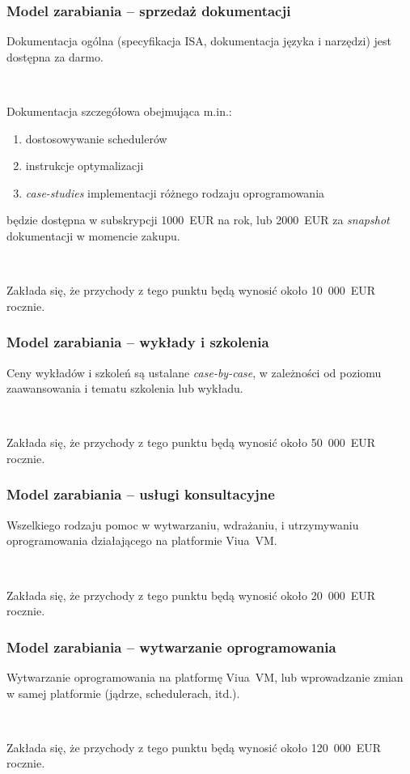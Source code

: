 \documentclass[aspectratio=169]{beamer}
\begin{document}
\begin{frame}
    \frametitle{Model zarabiania -- sprzedaż dokumentacji}

    Dokumentacja ogólna (specyfikacja ISA, dokumentacja języka i narzędzi) jest
    dostępna za darmo.

    ~

    Dokumentacja szczegółowa obejmująca m.in.:

    \begin{enumerate}
        \item dostosowywanie schedulerów
        \item instrukcje optymalizacji
        \item \emph{case-studies} implementacji różnego rodzaju oprogramowania
    \end{enumerate}

    będzie dostępna w subskrypcji 1000~EUR na rok, lub 2000~EUR za
    \emph{snapshot} dokumentacji w momencie zakupu.

    ~

    Zakłada się, że przychody z tego punktu będą wynosić około 10~000~EUR rocznie.
\end{frame}

\begin{frame}
    \frametitle{Model zarabiania -- wykłady i szkolenia}

    Ceny wykładów i szkoleń są ustalane \emph{case-by-case}, w zależności od
    poziomu zaawansowania i tematu szkolenia lub wykładu.

    ~

    Zakłada się, że przychody z tego punktu będą wynosić około 50~000~EUR rocznie.
\end{frame}

\begin{frame}
    \frametitle{Model zarabiania -- usługi konsultacyjne}

    Wszelkiego rodzaju pomoc w wytwarzaniu, wdrażaniu, i utrzymywaniu
    oprogramowania działającego na platformie Viua~VM.

    ~

    Zakłada się, że przychody z tego punktu będą wynosić około 20~000~EUR
    rocznie.
\end{frame}

\begin{frame}
    \frametitle{Model zarabiania -- wytwarzanie oprogramowania}

    Wytwarzanie oprogramowania na platformę Viua~VM, lub
    \newline
    wprowadzanie zmian w samej platformie (jądrze, schedulerach, itd.).

    ~

    Zakłada się, że przychody z tego punktu będą wynosić około 120~000~EUR
    rocznie.
\end{frame}
\end{document}
